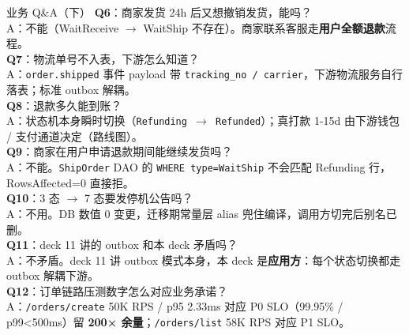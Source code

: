 \documentclass[aspectratio=169,11pt]{beamer}
\begin{document}
\begin{frame}[shrink]{业务 Q\&A（下）}
\textbf{Q6}：商家发货 24h 后又想撤销发货，能吗？\\
\hspace{4mm}\small A：不能（WaitReceive $\to$ WaitShip 不存在）。商家联系客服走\textbf{用户全额退款}流程。\\

\vspace{1mm}
\textbf{Q7}：物流单号不入表，下游怎么知道？\\
\hspace{4mm}\small A：\texttt{order.shipped} 事件 payload 带 \texttt{tracking\_no / carrier}，下游物流服务自行落表；标准 outbox 解耦。\\

\vspace{1mm}
\textbf{Q8}：退款多久能到账？\\
\hspace{4mm}\small A：状态机本身瞬时切换（\texttt{Refunding $\to$ Refunded}）；真打款 1-15d 由下游钱包 / 支付通道决定（路线图）。\\

\vspace{1mm}
\textbf{Q9}：商家在用户申请退款期间能继续发货吗？\\
\hspace{4mm}\small A：不能。\texttt{ShipOrder} DAO 的 \texttt{WHERE type=WaitShip} 不会匹配 Refunding 行，RowsAffected=0 直接拒。\\

\vspace{1mm}
\textbf{Q10}：3 态 $\to$ 7 态要发停机公告吗？\\
\hspace{4mm}\small A：不用。DB 数值 0 变更，迁移期常量层 alias 兜住编译，调用方切完后别名已删。\\

\vspace{1mm}
\textbf{Q11}：deck 11 讲的 outbox 和本 deck 矛盾吗？\\
\hspace{4mm}\small A：不矛盾。deck 11 讲 outbox 模式本身，本 deck 是\textbf{应用方}：每个状态切换都走 outbox 解耦下游。\\

\vspace{1mm}
\textbf{Q12}：订单链路压测数字怎么对应业务承诺？\\
\hspace{4mm}\small A：\texttt{/orders/create} 50K RPS / p95 2.33ms 对应 P0 SLO（99.95\% / p99<500ms）留 \textbf{200× 余量}；\texttt{/orders/list} 58K RPS 对应 P1 SLO。\\
\end{frame}
\end{document}
